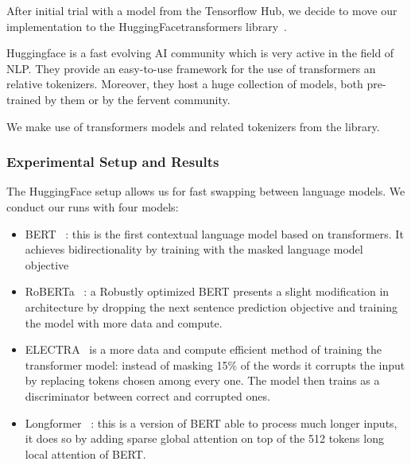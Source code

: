 \documentclass{article}
\begin{document}
After initial trial with a model from the Tensorflow Hub, we decide to move our implementation to the HuggingFace\huggingface transformers library~\cite{Huggingface}.

Huggingface is a fast evolving AI community which is very active in the field of NLP. They provide an easy-to-use framework for the use of transformers an relative tokenizers. Moreover, they host a huge collection of models, both pre-trained by them or by the fervent community.

We make use of transformers models and related tokenizers from the library.


\subsubsection{Experimental Setup and Results}

The HuggingFace setup allows us for fast swapping between language models. We conduct our runs with four models:

\begin{itemize}
\item BERT ~\cite{devlin2019bert}: this is the first contextual language model based on transformers. It achieves bidirectionality by training with the masked language model objective 
\item RoBERTa ~\cite{liu2019roberta}: a Robustly optimized BERT presents a slight modification in architecture by dropping the next sentence prediction objective and training the model with more data and compute.   %
\item ELECTRA  ~\cite{clark2020electra}is a more data and compute efficient method of training the transformer model: instead of masking 15\% of the words it corrupts the input by replacing tokens chosen among every one. The model then trains as a discriminator between correct and corrupted ones.
\item Longformer ~\cite{beltagy2020longformer}: this is a version of BERT able to process much longer inputs, it does so by adding sparse global attention on top of the 512 tokens long local attention of BERT.
\end{itemize}
\end{document}
